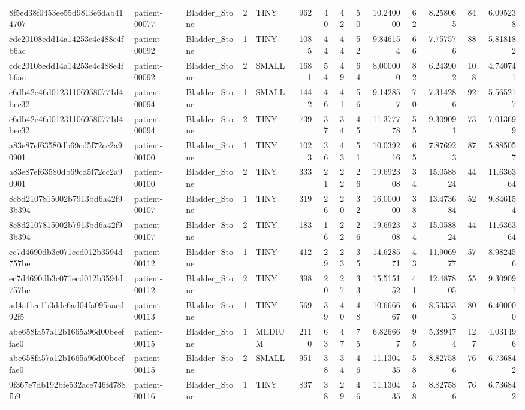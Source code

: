 \begin{tabular}{lllrlrrrrrrrrr}
8f5ed38f0453ee55d9813e6dab414707 & patient-00077 & Bladder_Stone & 2 & TINY & 962 & 40 & 42 & 50 & 10.240000 & 62 & 8.258065 & 84 & 6.095238 \\
cdc20108edd14a14253e4c488e4fb6ac & patient-00092 & Bladder_Stone & 1 & TINY & 1085 & 44 & 44 & 52 & 9.846154 & 66 & 7.757576 & 88 & 5.818182 \\
cdc20108edd14a14253e4c488e4fb6ac & patient-00092 & Bladder_Stone & 2 & SMALL & 1681 & 54 & 49 & 64 & 8.000000 & 82 & 6.243902 & 108 & 4.740741 \\
e6db42e46d012311069580771d4bec32 & patient-00094 & Bladder_Stone & 1 & SMALL & 1442 & 46 & 41 & 56 & 9.142857 & 70 & 7.314286 & 92 & 5.565217 \\
e6db42e46d012311069580771d4bec32 & patient-00094 & Bladder_Stone & 2 & TINY & 739 & 37 & 34 & 45 & 11.377778 & 55 & 9.309091 & 73 & 7.013699 \\
a83e87ef63580db69cd5f72cc2a90901 & patient-00100 & Bladder_Stone & 1 & TINY & 1023 & 36 & 43 & 51 & 10.039216 & 65 & 7.876923 & 87 & 5.885057 \\
a83e87ef63580db69cd5f72cc2a90901 & patient-00100 & Bladder_Stone & 2 & TINY & 333 & 21 & 22 & 26 & 19.692308 & 34 & 15.058824 & 44 & 11.636364 \\
8c8d2107815002b7913bd6a42f93b394 & patient-00107 & Bladder_Stone & 1 & TINY & 319 & 26 & 20 & 32 & 16.000000 & 38 & 13.473684 & 52 & 9.846154 \\
8c8d2107815002b7913bd6a42f93b394 & patient-00107 & Bladder_Stone & 2 & TINY & 183 & 16 & 22 & 26 & 19.692308 & 34 & 15.058824 & 44 & 11.636364 \\
ec7d4690db3c071ecd012b3594d757be & patient-00112 & Bladder_Stone & 1 & TINY & 412 & 29 & 23 & 35 & 14.628571 & 43 & 11.906977 & 57 & 8.982456 \\
ec7d4690db3c071ecd012b3594d757be & patient-00112 & Bladder_Stone & 2 & TINY & 398 & 20 & 27 & 33 & 15.515152 & 41 & 12.487805 & 55 & 9.309091 \\
ad4af1ce1b3dde6ad04fa095aacd92f5 & patient-00113 & Bladder_Stone & 1 & TINY & 569 & 39 & 40 & 48 & 10.666667 & 60 & 8.533333 & 80 & 6.400000 \\
abe658fa57a12b1665a96d00beeffae0 & patient-00115 & Bladder_Stone & 1 & MEDIUM & 2110 & 63 & 47 & 75 & 6.826667 & 95 & 5.389474 & 127 & 4.031496 \\
abe658fa57a12b1665a96d00beeffae0 & patient-00115 & Bladder_Stone & 2 & SMALL & 951 & 38 & 34 & 46 & 11.130435 & 58 & 8.827586 & 76 & 6.736842 \\
9f367e7db192bfe532ace746fd788fb9 & patient-00116 & Bladder_Stone & 1 & TINY & 837 & 38 & 29 & 46 & 11.130435 & 58 & 8.827586 & 76 & 6.736842 \\

\end{tabular}
